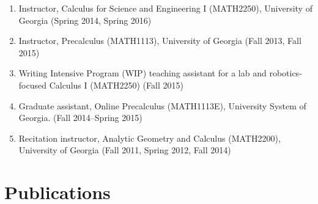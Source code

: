\documentclass[letterpaper]{article}
\begin{document}
\begin{enumerate}
\item Instructor, Calculus for Science and Engineering I (MATH2250), University of Georgia (Spring 2014, Spring 2016)
\item Instructor, Precalculus (MATH1113), University of Georgia (Fall 2013, Fall 2015)
\item Writing Intensive Program (WIP) teaching assistant for a lab and robotics-focused Calculus I (MATH2250) (Fall 2015)
\item Graduate assistant, Online
  Precalculus (MATH1113E), University System of Georgia. (Fall 2014--Spring 2015)
\item Recitation instructor, Analytic Geometry and Calculus
  (MATH2200), University of Georgia (Fall 2011, Spring 2012, Fall 2014)
\end{enumerate}

\section*{Publications}
\end{document}
